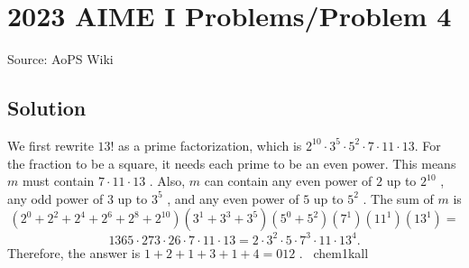 \documentclass[12pt]{article}
\begin{document}
\section*{{2023 AIME I Problems/Problem 4}}
Source: AoPS Wiki

\subsection*{Solution}
We first rewrite $13!$ as a prime factorization, which is $2^{10}\cdot3^5\cdot5^2\cdot7\cdot11\cdot13.$ For the fraction to be a square, it needs each prime to be an even power. This means $m$ must contain $7\cdot11\cdot13$ . Also, $m$ can contain any even power of $2$ up to $2^{10}$ , any odd power of $3$ up to $3^{5}$ , and any even power of $5$ up to $5^{2}$ . The sum of $m$ is \[(2^0+2^2+2^4+2^6+2^8+2^{10})(3^1+3^3+3^5)(5^0+5^2)(7^1)(11^1)(13^1) =\] \[1365\cdot273\cdot26\cdot7\cdot11\cdot13 = 2\cdot3^2\cdot5\cdot7^3\cdot11\cdot13^4.\] Therefore, the answer is $1+2+1+3+1+4=\boxed{012}$ . ~chem1kall
\end{document}
